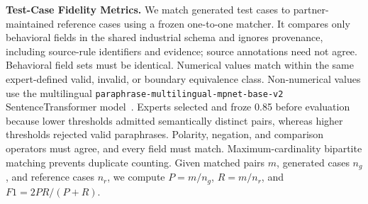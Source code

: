 \begin{table}[!t]
    \setlength{\tabcolsep}{2pt}
    \caption{Details of the six financial datasets used in Experiment I. ``\#'' denotes the number of Rules, Nested Rules (Nest.), Dependent Rule Pairs (Dep.), Requirements (Req.), Fine-Grained Constraints (Cons.), and Test Cases (TC).}
    \label{tab:exp1_dataset}
    \centering
\end{table}

\noindent
\textbf{Test-Case Fidelity Metrics.}
We match generated test cases to partner-maintained reference cases using a
frozen one-to-one matcher. It compares only behavioral fields in
the shared industrial schema and ignores provenance, including source-rule
identifiers and evidence; source annotations need not agree. Behavioral field
sets must be identical. Numerical values match within the same expert-defined
valid, invalid, or boundary equivalence class. Non-numerical values use the
multilingual
\texttt{paraphrase-multilingual-mpnet-base-v2} SentenceTransformer
model~\cite{reimers2019sentence}. Experts selected and froze 0.85 before
evaluation because lower thresholds admitted semantically distinct pairs,
whereas higher thresholds rejected valid paraphrases.
Polarity, negation, and comparison operators must agree, and every field must
match. Maximum-cardinality bipartite matching prevents duplicate counting.
Given matched pairs $m$, generated cases $n_g$, and
reference cases $n_r$, we compute $P=m/n_g$, $R=m/n_r$, and
$F1=2PR/(P+R)$.

